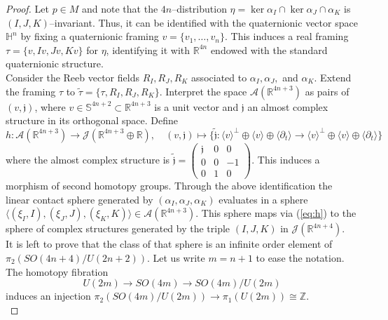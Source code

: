\documentclass[10pt]{amsart}
\begin{document}
\begin{proof}
Let $p\in M$ and note that the $4n$--distribution $\eta=\ker\alpha_I\cap\ker\alpha_J\cap\alpha_K$ is $(I,J,K)$--invariant. Thus, it can be identified with the quaternionic vector space ${\mathbb{H}}^n$ by fixing a quaternionic framing $v=\{v_1,\ldots,v_n\}$. This induces a real framing $\tau=\{v,Iv,Jv,Kv\}$ for $\eta$, identifying it with ${\mathbb{R}}^{4n}$ endowed with the standard quaternionic structure.\\

\noindent Consider the Reeb vector fields $R_I,R_J,R_K$ associated to $\alpha_I,\alpha_J,$ and $\alpha_K$. Extend the framing $\tau$ to $\widetilde\tau=\{\tau,R_I,R_J,R_K\}$. Interpret the space ${\mathcal{A}}({\mathbb{R}}^{4n+3})$ as pairs of $(v,{\mathfrak{j}})$, where $v\in{\mathbb{S}}^{4n+2}\subset{\mathbb{R}}^{4n+3}$ is a unit vector and ${\mathfrak{j}}$ an almost complex structure in its orthogonal space. Define
\begin{equation}\label{eq:h}
h: {\mathcal{A}}({\mathbb{R}}^{4n+3})\longrightarrow\mathcal{J}({\mathbb{R}}^{4n+3}\oplus{\mathbb{R}}),\quad (v,{\mathfrak{j}})\longmapsto\{\widetilde{\mathfrak{j}}:\langle v\rangle^{\perp}\oplus\langle v\rangle\oplus\langle\partial_t\rangle\longrightarrow \langle v\rangle^{\perp}\oplus\langle v\rangle\oplus\langle\partial_t\rangle\}
\end{equation}
where the almost complex structure is $\widetilde{\mathfrak{j}}=\left(\begin{array}{ccc}
{\mathfrak{j}} & 0 & 0\\
0 & 0 & -1\\
0 & 1 & 0
\end{array}\right)$. This induces a morphism of second homotopy groups. Through the above identification the linear contact sphere generated by $(\alpha_I,\alpha_J,\alpha_K)$ evaluates in a sphere $\langle(\xi_I,I),(\xi_J,J),(\xi_K,K)\rangle\in{\mathcal{A}}({\mathbb{R}}^{4n+3})$. This sphere maps via (\ref{eq:h}) to the sphere of complex structures generated by the triple $(I,J,K)$ in $\mathcal{J}({\mathbb{R}}^{4n+4})$.\\

\noindent It is left to prove that the class of that sphere is an infinite order element of $\pi_2(SO(4n+4)/U(2n+2))$. Let us write $m=n+1$ to ease the notation. The homotopy fibration
$$U(2m)\longrightarrow SO(4m)\longrightarrow SO(4m)/U(2m)$$
induces an injection $\pi_2(SO(4m)/U(2m))\longrightarrow\pi_1(U(2m))\cong{\mathbb{Z}}$.\\


\end{proof}
\end{document}
